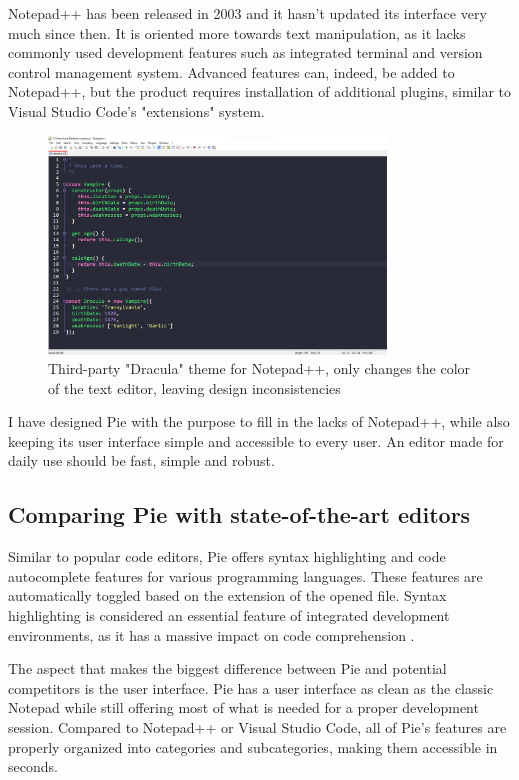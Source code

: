 Notepad++ has been released in 2003 and it hasn't updated its interface very much since then. It is oriented more towards text manipulation, as it lacks commonly used development features such as integrated terminal and version control management system. Advanced features can, indeed, be added to Notepad++, but the product requires installation of additional plugins, similar to Visual Studio Code's "extensions" system.

\begin{figure}[H]
\centering
\includegraphics[width=0.8\textwidth]{images/notepad-plus-plus-dark.jpg}
\caption{Third-party "Dracula" theme for Notepad++, only changes the color of the text editor, leaving design inconsistencies}
\label{fig:fig2,1.}
\end{figure}

I have designed Pie with the purpose to fill in the lacks of Notepad++, while also keeping its user interface simple and accessible to every user. An editor made for daily use should be fast, simple and robust.

\subsection{Comparing Pie with state-of-the-art editors}

Similar to popular code editors, Pie offers syntax highlighting and code autocomplete features for various programming languages. These features are automatically toggled based on the extension of the opened file. Syntax highlighting is considered an essential feature of integrated development environments, as it has a massive impact on code comprehension \cite{syntax}.

The aspect that makes the biggest difference between Pie and potential competitors is the user interface. Pie has a user interface as clean as the classic Notepad while still offering most of what is needed for a proper development session. Compared to Notepad++ or Visual Studio Code, all of Pie's features are properly organized into categories and subcategories, making them accessible in seconds.

